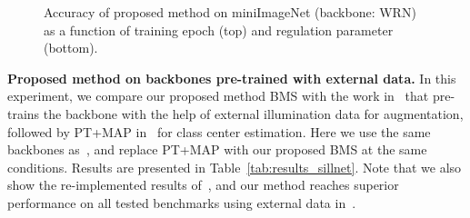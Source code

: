 \documentclass[review]{elsarticle}
\begin{document}
\begin{figure}[h]
\begin{center}
  \end{center}
  \vspace{-.5cm}
  \caption{Accuracy of proposed method on miniImageNet (backbone: WRN) as a function of training epoch  (top) and regulation parameter  (bottom).}
  \label{fig:functionofe}
\end{figure}

\textbf{Proposed method on backbones pre-trained with external data.} In this experiment, we compare our proposed method BMS with the work in~\cite{DBLP:journals/corr/abs-2102-03539} that pre-trains the backbone with the help of external illumination data for augmentation, followed by PT+MAP in~\cite{hu2021leveraging} for class center estimation. Here we use the same backbones as~\cite{DBLP:journals/corr/abs-2102-03539}, and replace PT+MAP with our proposed BMS at the same conditions. Results are presented in Table~\ref{tab:results_sillnet}. Note that we also show the re-implemented results of~\cite{DBLP:journals/corr/abs-2102-03539}, and our method reaches superior performance on all tested benchmarks using external data in~\cite{DBLP:journals/corr/abs-2102-03539}.

\begin{table}[h]
    \caption{Proposed method on backbones pre-trained with external data. Note that - denotes the re-implementation of an existing method.}
    \centering
    \label{tab:results_sillnet}
\end{table}
\end{document}
